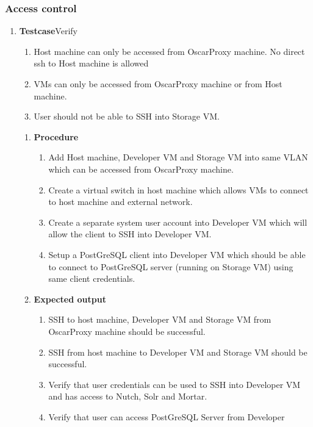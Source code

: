 \subsubsection{Access control}
\begin{enumerate}
\item \textbf{Testcase}\newline Verify
  \begin{enumerate}
    \item Host machine can only be accessed from OscarProxy
      machine. No direct ssh to Host machine is allowed
    \item VMs can only be accessed from OscarProxy machine or from
      Host machine.
    \item User should not be able to SSH into Storage VM.
  \end{enumerate}
  \begin{enumerate}[label={}]
  \item \textbf{Procedure}\newline
    \begin{enumerate}
      \item Add Host machine, Developer VM and Storage VM into same
        VLAN which can be accessed from OscarProxy machine.
      \item Create a virtual switch in host machine which allows VMs
        to connect to host machine and external network.
      \item Create a separate system user account into Developer VM
        which will allow the client to SSH into Developer VM.
      \item Setup a PostGreSQL client into Developer VM which should be
        able to connect to PostGreSQL server (running on Storage VM)
        using same client credentials.
     \end{enumerate}
  \item \textbf{Expected output}\newline
    \begin{enumerate}
      \item SSH to host machine, Developer VM and Storage VM from
        OscarProxy machine should be successful.
      \item SSH from host machine to Developer VM and Storage VM
        should be successful.
      \item Verify that user credentials can be used to SSH into
        Developer VM and has access to Nutch, Solr and Mortar.
      \item Verify that user can access PostGreSQL Server from Developer

\end{enumerate}
\end{enumerate}
\end{enumerate}
